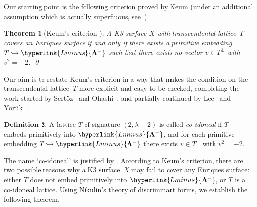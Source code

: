 \documentclass[a4paper]{amsart}
\theoremstyle{definition}
\newtheorem{definition}{Definition}[section]
\theoremstyle{plain}
\newtheorem{theorem}[definition]{Theorem}
\newcommand{\bLambda}{\mathbf{\Lambda}}
\newcommand{\Lminus}{\hyperlink{Lminus}{\bLambda^-}}
\begin{document}
Our starting point is the following criterion proved by Keum (under an additional assumption which is actually superfluous, see~\cite{Ohashi}). 

\begin{theorem}[Keum's criterion \cite{Keum90}] \label{thm:keum}
A K3 surface \(X\) with transcendental lattice~\(T\) covers an Enriques surface if and only if 
there exists a primitive embedding \(T \hookrightarrow \Lminus\) 
such that there exists no vector \(v \in T^\perp\) with \(v^2 = -2\). \qed
\end{theorem}


Our aim is to restate Keum's criterion in a way that makes the condition on the transcendental lattice~\(T\) more explicit and easy to be checked, completing the work started by Sertöz~\cite{Sertoez05} and Ohashi~\cite{Ohashi}, and partially continued by Lee~\cite{Lee12} and Yörük~\cite{Yoruk}.

\begin{definition} \label{def:co-idoneal}
    A lattice \(T\) of signature \((2,\lambda-2)\) is called \emph{co-idoneal} if \(T\) embeds primitively into \(\Lminus\), and for each primitive embedding \(T \hookrightarrow \Lminus\) there exists \(v \in T^\perp\) with \(v^2 = -2\). 
\end{definition}

The name `co-idoneal' is justified by .
According to Keum's criterion, there are two possible reasons why a K3 surface~\(X\) may fail to cover any Enriques surface: either \(T\) does not embed primitively into~\(\Lminus\), or \(T\) is a co-idoneal lattice.  
Using Nikulin's theory of discriminant forms, we establish the following theorem.
\end{document}
